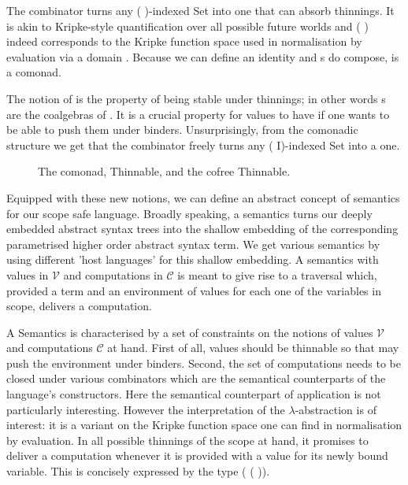 The  combinator turns any ( )-indexed Set into one that can absorb
thinnings. It is akin to Kripke-style quantification over all possible future
worlds and  (  ) indeed corresponds to the Kripke
function space used in normalisation by evaluation via a domain .
Because we can define an identity  and s do
compose,  is a comonad.

The notion of  is the property of being stable under thinnings;
in other words s are the coalgebras of .
It is a crucial property for values to have if one wants to be able to push
them under binders. Unsurprisingly, from the comonadic structure we get that
the  combinator freely turns any ( I)-indexed Set into a
 one.

\begin{figure}[h]
\begin{minipage}{0.45\textwidth}
\end{minipage}\hspace{2em}
\begin{minipage}{0.45\textwidth}
\end{minipage}
\caption{The  comonad, Thinnable, and the cofree Thinnable.}
\end{figure}

Equipped with these new notions, we can define an abstract
concept of semantics for our scope safe language. Broadly
speaking, a semantics turns our deeply embedded abstract
syntax trees into the shallow embedding of the corresponding
parametrised higher order abstract syntax term. We get various
semantics by using different 'host languages' for this shallow
embedding. A semantics with values in $\mathcal{V}$ and
computations in $\mathcal{C}$ is meant to give rise to a
traversal which, provided a term and an environment of values
for each one of the variables in scope, delivers a computation.

A Semantics is characterised by a set of constraints on the notions of
values $\mathcal{V}$ and computations $\mathcal{C}$ at hand. First of all,
values should be thinnable so that  may push the environment
under binders. Second, the set of computations needs to be closed
under various combinators which are the semantical counterparts of
the language's constructors. Here the semantical counterpart of
application is not particularly interesting. However the interpretation
of the $\lambda$-abstraction is of interest: it is a variant on
the Kripke function space one can find in normalisation by evaluation.
In all possible thinnings of the scope at hand, it promises to deliver
a computation whenever it is provided with a value for its newly
bound variable. This is concisely expressed by the type
( (  )).


